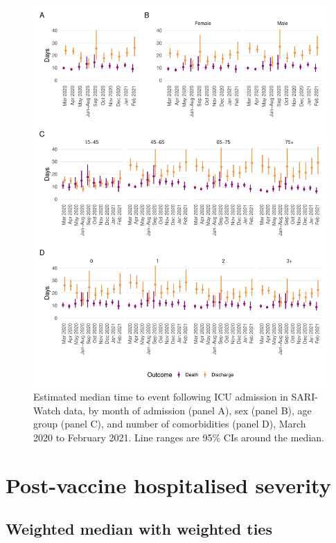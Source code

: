 \begin{figure}[htbp!]
    \centering
    \includegraphics[width=\textwidth]{sari_med_time_icu.pdf}
    \caption[Estimated median time to event following ICU admission in SARI-Watch data, March 2020 to February 2021]{Estimated median time to event following ICU admission in SARI-Watch data, by month of admission (panel A), sex (panel B), age group (panel C), and number of comorbidities (panel D), March 2020 to February 2021. Line ranges are 95\% CIs around the median.}\label{fig:sari-med-time-icu}
\end{figure}

\clearpage

\section{Post-vaccine hospitalised severity}

\subsection{Weighted median with weighted ties}\label{sec:weighted-median}


